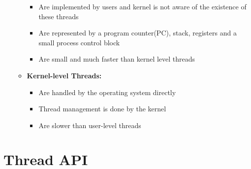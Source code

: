 \documentclass[12pt]{article}
\begin{document}
\begin{itemize}
\begin{itemize}
        \begin{itemize}
            \item Are implemented by users and kernel is not aware of the existence of these threads
            \item Are represented by a program counter(PC), stack, registers and a small process control block
            \item Are small and much faster than kernel level threads
        \end{itemize}
        \item \textbf{Kernel-level Threads:}

        \begin{itemize}
            \item Are handled by the operating system directly
            \item Thread management is done by the kernel
            \item Are slower than user-level threads
        \end{itemize}
    \end{itemize}
\end{itemize}

\section{Thread API}
\end{document}
